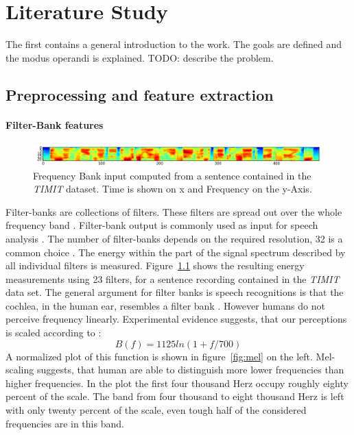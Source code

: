 \chapter{Literature Study}
\label{cha:intro}
The first contains a general introduction to the work. The goals are
defined and the modus operandi is explained.
TODO: describe the problem.


\section{Preprocessing and feature extraction}

\subsubsection{Filter-Bank features}
\begin{figure}
\centering
\includegraphics[width=1.0\linewidth]{../png/timitInput}
\caption{Frequency Bank input computed from a sentence contained in the \textit{TIMIT} dataset. Time is shown on x and Frequency on the y-Axis.}
\label{fig:timitInput}
\end{figure}
Filter-banks are collections of filters. These filters are spread out over the whole frequency band \cite[page 251]{Huang2001}. Filter-bank output is commonly used as input for speech analysis \cite{Huang2001}\cite{Chan2015}. The number of filter-banks depends on the required resolution, 32 is a common choice \cite{Juang1987}. The energy within the part of the signal spectrum described by all individual filters is measured. Figure~\ref{fig:timitInput} shows the resulting energy measurements using 23 filters, for a sentence recording contained in the \textit{TIMIT} data set. 
The general argument for filter banks is speech recognitions is that the cochlea, in the human ear, resembles a filter bank \cite[page 30]{Huang2001}. However humans do not perceive frequency linearly. Experimental evidence suggests, that our perceptions is scaled according to \cite[page 34]{Huang2001}:
\begin{equation}
B(f) = 1125 ln(1 + f / 700)
\end{equation}
A normalized plot of this function is shown in figure~\ref{fig:mel} on the left.
Mel-scaling suggests, that human are able to distinguish more lower frequencies than higher frequencies. In the plot the first four thousand Herz occupy roughly eighty percent of the scale. The band from four thousand to eight thousand Herz is left with only twenty percent of the scale, even tough half of the considered frequencies are in this band. 
